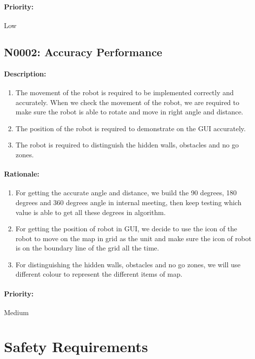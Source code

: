 \documentclass[11pt, a4paper]{report}
\begin{document}
\paragraph{Priority:}
Low

\subsection{N0002: Accuracy Performance}
\paragraph{Description:}
\begin{enumerate}
\item The movement of the robot is required to be implemented correctly and accurately. When we check the movement of the robot, we are required to make sure the robot is able to rotate and move in right angle and distance.
\item The position of the robot is required to demonstrate on the GUI accurately.
\item The robot is required to distinguish the hidden walls, obstacles and no go zones.
  \end{enumerate}
\paragraph{Rationale:}
\begin{enumerate}
\item For getting the accurate angle and distance, we build the 90 degrees, 180 degrees and 360 degrees angle in internal meeting, then keep testing which value is able to get all these degrees in algorithm.
\item For getting the position of robot in GUI, we decide to use the icon of the robot to move on the map in grid as the unit and make sure the icon of robot is on the boundary line of the grid all the time.
\item For distinguishing the hidden walls, obstacles and no go zones, we will use different colour to represent the different items of map. 
\end{enumerate}
\paragraph{Priority:}
Medium

\section{Safety Requirements}
\end{document}

